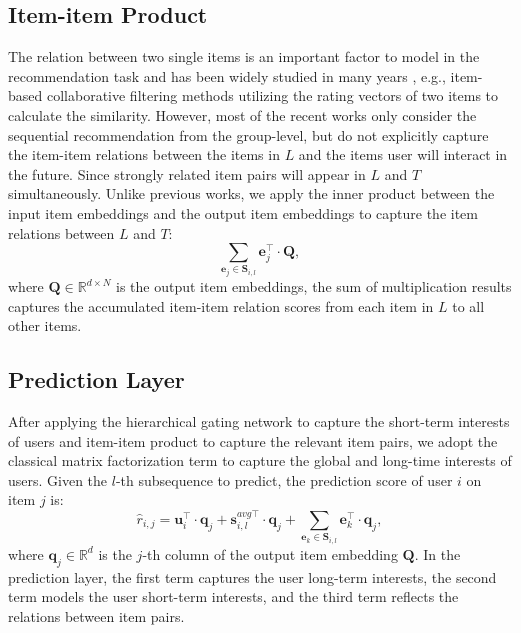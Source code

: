 \documentclass[sigconf]{acmart}
\begin{document}
\subsection{Item-item Product}
The relation between two single items is an important factor to model in the recommendation task and has been widely studied in many years \cite{DBLP:reference/sp/NingDK15,DBLP:conf/kdd/KabburNK13}, e.g., item-based collaborative filtering methods utilizing the rating vectors of two items to calculate the similarity. However, most of the recent works \cite{DBLP:conf/wsdm/TangW18,DBLP:conf/cikm/HidasiK18,DBLP:conf/icdm/KangM18} only consider the sequential recommendation from the group-level, but do not explicitly capture the item-item relations between the items in $ L $ and the items user will interact in the future. Since strongly related item pairs will appear in $ L $ and $ T $ simultaneously. Unlike previous works, we apply the inner product between the input item embeddings and the output item embeddings to capture the item relations between $ L $ and $ T $:
\[
\sum_{\mathbf{e}_j \in \mathbf{S}_{i,l}} \mathbf{e}^{\top}_j \cdot \mathbf{Q},
\]
where $ \mathbf{Q} \in \mathbb{R}^{d \times N} $ is the output item embeddings, the sum of multiplication results captures the accumulated item-item relation scores from each item in $ L $ to all other items.

\subsection{Prediction Layer}
After applying the hierarchical gating network to capture the short-term interests of users and item-item product to capture the relevant item pairs, we adopt the classical matrix factorization term to capture the global and long-time interests of users. Given the $ l $-th subsequence to predict, the prediction score of user $ i $ on item $ j $ is:
\begin{equation}
\hat{r}_{i,j} = \mathbf{u}_{i}^{\top} \cdot \mathbf{q}_{j} + \mathbf{s}^{avg \top}_{i,l} \cdot \mathbf{q}_{j} + \sum_{\mathbf{e}_{k} \in \mathbf{S}_{i,l}} \mathbf{e}^{\top}_{k} \cdot \mathbf{q}_{j},
\end{equation}
where $ \mathbf{q}_{j} \in \mathbb{R}^{d} $ is the $ j $-th column of the output item embedding $ \mathbf{Q} $. In the prediction layer, the first term captures the user long-term interests, the second term models the user short-term interests, and the third term reflects the relations between item pairs.
\end{document}
